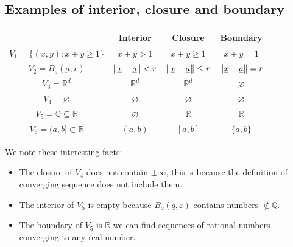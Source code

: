 \documentclass[10pt]{extarticle}
\newcommand{\R}{\mathbb{R}}
\newcommand{\Q}{\mathbb{Q}}
\newcommand{\munderbar}[1]{\underbar{\ensuremath{#1}}}
\begin{document}
                \subsection{Examples of interior, closure and boundary}

                \begin{center}
                    \begin{tabular}{ |c|c|c|c| }
                        \hline
                                                            & Interior                                   & Closure                                       & Boundary                                   \\
                        \hline
                        $V_1 = \{ (x, y) : x + y \geq 1 \}$ & $x + y > 1$                                & $x + y \geq 1$                                & $x + y = 1$                                \\
                        $V_2 = B_o(\munderbar{a}, r)$       & $\norm{\munderbar{x} - \munderbar{a}} < r$ & $\norm{\munderbar{x} - \munderbar{a}} \leq r$ & $\norm{\munderbar{x} - \munderbar{a}} = r$ \\
                        $V_3 = \R^d$                        & $\R^d$                                     & $\R^d$                                        & $\varnothing$                              \\
                        $V_4 = \varnothing$                 & $\varnothing$                              & $\varnothing$                                 & $\varnothing$                              \\
                        $V_5 = \Q \subseteq \R$             & $\varnothing$                              & $\R$                                          & $\R$                                       \\
                        $V_6 = (a, b] \subset \R$           & $(a, b)$                                   & $[a, b]$                                      & $\{a, b\}$                                 \\
                        \hline
                    \end{tabular}
                \end{center}

                We note these interesting facts:
                \begin{itemize}
                    \item The closure of $V_4$ does not contain $\pm \infty$, this is because the definition of converging sequence does not include them.
                    \item The interior of $V_5$ is empty because $B_o(q, \varepsilon)$ contains numbers $\notin \Q$.
                    \item The boundary of $V_5$ is $\R$ we can find sequences of rational numbers converging to any real number.
                \end{itemize}
\end{document}
